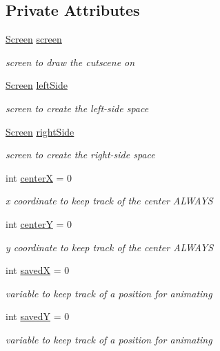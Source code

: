 \subsection*{Private Attributes}
\begin{DoxyCompactItemize}
\item 
\hyperlink{classScreen}{Screen} \hyperlink{classCutscene_a70df90fafe45f9a661d9e05ac4dd2a22}{screen}
\begin{DoxyCompactList}\small\item\em screen to draw the cutscene on \end{DoxyCompactList}\item 
\hyperlink{classScreen}{Screen} \hyperlink{classCutscene_aac25c81316f03b3c3caf0bdf735926bc}{left\-Side}
\begin{DoxyCompactList}\small\item\em screen to create the left-\/side space \end{DoxyCompactList}\item 
\hyperlink{classScreen}{Screen} \hyperlink{classCutscene_ac8cc850025b847d951e74418b757d62c}{right\-Side}
\begin{DoxyCompactList}\small\item\em screen to create the right-\/side space \end{DoxyCompactList}\item 
int \hyperlink{classCutscene_a70148f85e3ef15175751eeb5e92fb870}{center\-X} = 0
\begin{DoxyCompactList}\small\item\em x coordinate to keep track of the center A\-L\-W\-A\-Y\-S \end{DoxyCompactList}\item 
int \hyperlink{classCutscene_a471290d79d01f029ad56bdfa7472ce40}{center\-Y} = 0
\begin{DoxyCompactList}\small\item\em y coordinate to keep track of the center A\-L\-W\-A\-Y\-S \end{DoxyCompactList}\item 
int \hyperlink{classCutscene_a1d5c331a4d60a28f84eaa987f2a2fb4f}{saved\-X} = 0
\begin{DoxyCompactList}\small\item\em variable to keep track of a position for animating \end{DoxyCompactList}\item 
int \hyperlink{classCutscene_af8166fd7fdf29fe8f86cadd29363fd78}{saved\-Y} = 0
\begin{DoxyCompactList}\small\item\em variable to keep track of a position for animating \end{DoxyCompactList}\item 

\end{DoxyCompactItemize}
